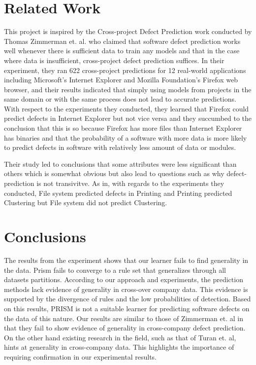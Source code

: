 \documentclass{sig-alternate}
\begin{document}
\section{Related Work}
This project is inspired by the Cross-project Defect Prediction work conducted by Thomas Zimmerman et. al. who claimed that software defect prediction works well whenever there is sufficient data to train any models and that in the case where data is insufficient, cross-project defect prediction suffices\cite{zimmerman09}. In their experiment, they ran 622 cross-project predictions for 12 real-world applications including Microsoft's Internet Explorer and Mozilla Foundation's Firefox web browser, and their results indicated that simply using models from projects in the same domain or with the same process does not lead to accurate predictions. With respect to the experiments they conducted, they learned that Firefox could predict defects in Internet Explorer but not vice versa and they succumbed to the conclusion that this is so because Firefox has more files than Internet Explorer has binaries and that the probability of a software with more data is more likely to predict defects in software with relatively less amount of data or modules.

Their study led to conclusions that some attributes were less significant than others which is somewhat obvious but also lead to questions such as why defect-prediction is not transivitve. As in, with regards to the experiments they conducted, File system predicted defects in Printing and Printing predicted Clustering but File system did not predict Clustering.

\section{Conclusions}
The results from the experiment shows that our learner fails to find generality in the data.
Prism fails to converge to a rule set that generalizes through all datasets partitions. According to our
approach and experiments, the prediction methods lack evidence of generality in cross-over company data.
This evidence is supported by the divergence of rules and the low probabilities of detection. Based on
this results, PRISM is not a suitable learner for predicting software defects on the data of this nature.
Our results are similar to those of  Zimmerman et. al in that they fail to show evidence of generality in 
cross-company defect prediction. On the other hand existing research in the field, such as that of Turan et. al, hints
at generality in cross-company data. This highlights the importance of requiring confirmation in our experimental results.  
\end{document}
